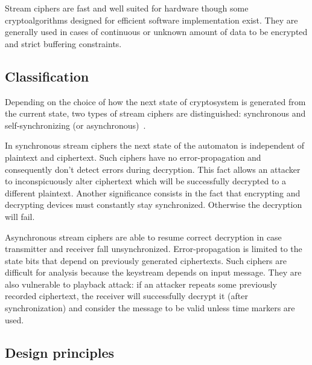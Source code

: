 Stream ciphers are fast and well suited for hardware though some
cryptoalgorithms designed for efficient software implementation exist. They are
generally used in cases of continuous or unknown amount of data to be encrypted
and strict buffering constraints.

\subsection{Classification}
\label{sec:stream_ciphers_classification}

Depending on the choice of how the next state of cryptosystem is generated from
the current state, two types of stream ciphers are distinguished: synchronous
and self-synchronizing (or asynchronous)~\cite{menezes:applied_cryptography}.

In synchronous stream ciphers the next state of the automaton is independent of
plaintext and ciphertext. Such ciphers have no error-propagation and
consequently don't detect errors during decryption. This fact allows an attacker
to inconspicuously alter ciphertext which will be successfully decrypted to a
different plaintext. Another significance consists in the fact that encrypting
and decrypting devices must constantly stay synchronized. Otherwise the
decryption will fail.

Asynchronous stream ciphers are able to resume correct decryption in case
transmitter and receiver fall unsynchronized. Error-propagation is limited to
the state bits that depend on previously generated ciphertexts. Such ciphers are
difficult for analysis because the keystream depends on input message. They
are also vulnerable to playback attack: if an attacker repeats some previously
recorded ciphertext, the receiver will successfully decrypt it (after
synchronization) and consider the message to be valid unless time markers are
used.

\subsection{Design principles}

